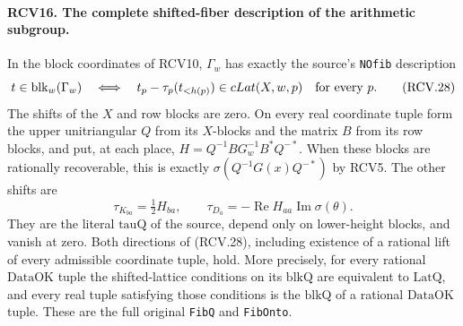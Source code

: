 \documentclass[11pt,a4paper]{article}
\numberwithin{equation}{section}
\theoremstyle{remark}\newtheorem{remark}[theorem]{Remark}
\begin{document}
\paragraph{RCV16. The complete shifted-fiber description of the arithmetic subgroup.}
\label{claim:RCV16}
In the block coordinates of RCV10, \(\Gamma_w\) has exactly the
source's \texttt{NOfib} description
\[
 t\in\operatorname{blk}_w(\Gamma_w)
 \quad\Longleftrightarrow\quad
 t_p-\tau_p(t_{<h(p)})\in cLat(X,w,p)\quad\hbox{for every }p.
\tag{RCV.28}
\]
The shifts of the \(X\) and row blocks are zero.  On every real
coordinate tuple form the upper unitriangular \(Q\) from its
\(X\)-blocks and the matrix \(B\) from its row blocks, and put,
at each place, \(H=Q^{-1}BG_w^{-1}B^*Q^{-*}\).
When these blocks are rationally recoverable, this is exactly
\(\sigma(Q^{-1}G(x)Q^{-*})\) by RCV5.  The other shifts are
\[
 \tau_{K_{ba}}=\tfrac12 H_{ba},\qquad
 \tau_{D_a}=-\operatorname{Re}H_{aa}
                                  \operatorname{Im}\sigma(\theta).
\tag{RCV.29}
\]
They are the literal \(\mathrm{tauQ}\) of the source, depend only
on lower-height blocks, and vanish at zero.  Both directions of
(RCV.28), including existence of a rational lift of every admissible
coordinate tuple, hold.  More precisely, for every rational
\(\mathrm{DataOK}\) tuple the shifted-lattice conditions on its
\(\mathrm{blkQ}\) are equivalent to \(\mathrm{LatQ}\), and
every real tuple satisfying those conditions is the \(\mathrm{blkQ}\)
of a rational \(\mathrm{DataOK}\) tuple.  These are the full
original \texttt{Fib\allowbreak Q} and \texttt{Fib\allowbreak Onto}.
\end{document}

